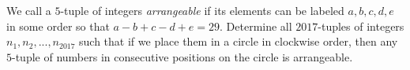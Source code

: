 We call a $5$-tuple of integers \emph{arrangeable} if its elements can be labeled $a, b, c, d, e$ in some order so that $a-b+c-d+e=29$. Determine all $2017$-tuples of integers $n_1, n_2, . . . , n_{2017}$ such that if we place them in a circle in clockwise order, then any $5$-tuple of numbers in consecutive positions on the circle is arrangeable.